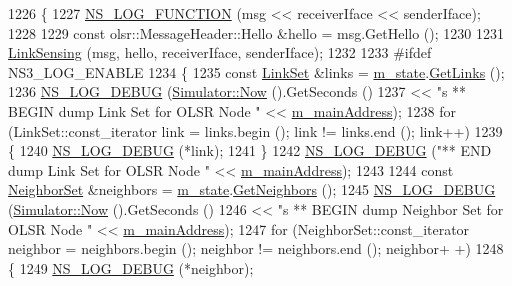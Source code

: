 \begin{DoxyCode}
1226 \{
1227   \hyperlink{log-macros-disabled_8h_a90b90d5bad1f39cb1b64923ea94c0761}{NS\_LOG\_FUNCTION} (msg << receiverIface << senderIface);
1228 
1229   \textcolor{keyword}{const} olsr::MessageHeader::Hello &hello = msg.GetHello ();
1230 
1231   \hyperlink{classns3_1_1olsr_1_1RoutingProtocol_a2a23a0fd6fa714fef6613afd3f5bc1d2}{LinkSensing} (msg, hello, receiverIface, senderIface);
1232 
1233 \textcolor{preprocessor}{#ifdef NS3\_LOG\_ENABLE}
1234   \{
1235     \textcolor{keyword}{const} \hyperlink{namespacens3_1_1olsr_a60381cc41d65a2e0daabd286077a378a}{LinkSet} &links = \hyperlink{classns3_1_1olsr_1_1RoutingProtocol_a07942ec1a7df71b609c8d2ff3b567c49}{m\_state}.\hyperlink{classns3_1_1olsr_1_1OlsrState_a1d8f1a95165973f05e3fd1ff0d76fbda}{GetLinks} ();
1236     \hyperlink{group__logging_ga413f1886406d49f59a6a0a89b77b4d0a}{NS\_LOG\_DEBUG} (\hyperlink{classns3_1_1Simulator_ac3178fa975b419f7875e7105be122800}{Simulator::Now} ().GetSeconds ()
1237                   << \textcolor{stringliteral}{"s ** BEGIN dump Link Set for OLSR Node "} << \hyperlink{classns3_1_1olsr_1_1RoutingProtocol_a58cc50ed5d1039aab603e90e318aabfb}{m\_mainAddress});
1238     \textcolor{keywordflow}{for} (LinkSet::const\_iterator link = links.begin (); link != links.end (); link++)
1239       \{
1240         \hyperlink{group__logging_ga413f1886406d49f59a6a0a89b77b4d0a}{NS\_LOG\_DEBUG} (*link);
1241       \}
1242     \hyperlink{group__logging_ga413f1886406d49f59a6a0a89b77b4d0a}{NS\_LOG\_DEBUG} (\textcolor{stringliteral}{"** END dump Link Set for OLSR Node "} << 
      \hyperlink{classns3_1_1olsr_1_1RoutingProtocol_a58cc50ed5d1039aab603e90e318aabfb}{m\_mainAddress});
1243 
1244     \textcolor{keyword}{const} \hyperlink{namespacens3_1_1olsr_af0afef1f28c6f0a0b528b03b638df05d}{NeighborSet} &neighbors = \hyperlink{classns3_1_1olsr_1_1RoutingProtocol_a07942ec1a7df71b609c8d2ff3b567c49}{m\_state}.\hyperlink{classns3_1_1olsr_1_1OlsrState_a82d5882ca3fdb93a9c1110c6f176c03c}{GetNeighbors} ();
1245     \hyperlink{group__logging_ga413f1886406d49f59a6a0a89b77b4d0a}{NS\_LOG\_DEBUG} (\hyperlink{classns3_1_1Simulator_ac3178fa975b419f7875e7105be122800}{Simulator::Now} ().GetSeconds ()
1246                   << \textcolor{stringliteral}{"s ** BEGIN dump Neighbor Set for OLSR Node "} << 
      \hyperlink{classns3_1_1olsr_1_1RoutingProtocol_a58cc50ed5d1039aab603e90e318aabfb}{m\_mainAddress});
1247     \textcolor{keywordflow}{for} (NeighborSet::const\_iterator neighbor = neighbors.begin (); neighbor != neighbors.end (); neighbor+
      +)
1248       \{
1249         \hyperlink{group__logging_ga413f1886406d49f59a6a0a89b77b4d0a}{NS\_LOG\_DEBUG} (*neighbor);

\end{DoxyCode}
